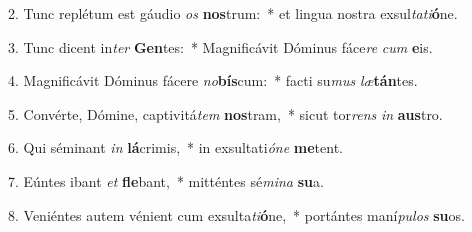 2. Tunc replétum est gáudio \textit{os} \textbf{nos}trum:~*  et lingua nostra exsul\textit{ta}\textit{ti}\textbf{ó}ne.\

3. Tunc dicent in\textit{ter} \textbf{Gen}tes:~*  Magnificávit Dóminus fáce\textit{re} \textit{cum} \textbf{e}is.\

4. Magnificávit Dóminus fácere \textit{no}\textbf{bís}cum:~*  facti su\textit{mus} \textit{læ}\textbf{tán}tes.\

5. Convérte, Dómine, captivitá\textit{tem} \textbf{nos}tram,~*  sicut tor\textit{rens} \textit{in} \textbf{aus}tro.\

6. Qui séminant \textit{in} \textbf{lá}crimis,~*  in exsultati\textit{ó}\textit{ne} \textbf{me}tent.\

7. Eúntes ibant \textit{et} \textbf{fle}bant,~*  mitténtes sé\textit{mi}\textit{na} \textbf{su}a.\

8. Veniéntes autem vénient cum exsulta\textit{ti}\textbf{ó}ne,~*  portántes maní\textit{pu}\textit{los} \textbf{su}os.\

